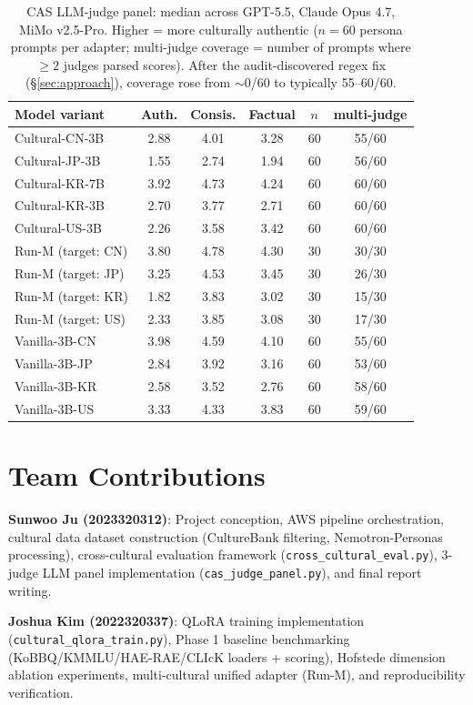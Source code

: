 \documentclass{article}
\begin{document}
\begin{table}[t]
\centering
\small
\caption{CAS LLM-judge panel: median across GPT-5.5, Claude Opus 4.7, MiMo v2.5-Pro. Higher = more culturally authentic ($n=60$ persona prompts per adapter; multi-judge coverage = number of prompts where $\ge 2$ judges parsed scores). After the audit-discovered regex fix (\S\ref{sec:approach}), coverage rose from $\sim$0/60 to typically 55--60/60.}
\label{tab:cas}
\begin{tabular}{lccccc}
\toprule
Model variant & Auth. & Consis. & Factual & $n$ & multi-judge \\
\midrule
Cultural-CN-3B & 2.88 & 4.01 & 3.28 & 60 & 55/60 \\
Cultural-JP-3B & 1.55 & 2.74 & 1.94 & 60 & 56/60 \\
Cultural-KR-7B & 3.92 & 4.73 & 4.24 & 60 & 60/60 \\
Cultural-KR-3B & 2.70 & 3.77 & 2.71 & 60 & 60/60 \\
Cultural-US-3B & 2.26 & 3.58 & 3.42 & 60 & 60/60 \\
Run-M (target: CN) & 3.80 & 4.78 & 4.30 & 30 & 30/30 \\
Run-M (target: JP) & 3.25 & 4.53 & 3.45 & 30 & 26/30 \\
Run-M (target: KR) & 1.82 & 3.83 & 3.02 & 30 & 15/30 \\
Run-M (target: US) & 2.33 & 3.85 & 3.08 & 30 & 17/30 \\
Vanilla-3B-CN & 3.98 & 4.59 & 4.10 & 60 & 55/60 \\
Vanilla-3B-JP & 2.84 & 3.92 & 3.16 & 60 & 53/60 \\
Vanilla-3B-KR & 2.58 & 3.52 & 2.76 & 60 & 58/60 \\
Vanilla-3B-US & 3.33 & 4.33 & 3.83 & 60 & 59/60 \\
\bottomrule
\end{tabular}
\end{table}

\section{Team Contributions}

\textbf{Sunwoo Ju (2023320312)}: Project conception, AWS pipeline orchestration, cultural data dataset construction (CultureBank filtering, Nemotron-Personas processing), cross-cultural evaluation framework (\verb|cross_cultural_eval.py|), 3-judge LLM panel implementation (\verb|cas_judge_panel.py|), and final report writing.

\textbf{Joshua Kim (2022320337)}: QLoRA training implementation (\verb|cultural_qlora_train.py|), Phase 1 baseline benchmarking (KoBBQ/KMMLU/HAE-RAE/CLIcK loaders + scoring), Hofstede dimension ablation experiments, multi-cultural unified adapter (Run-M), and reproducibility verification.
\end{document}

